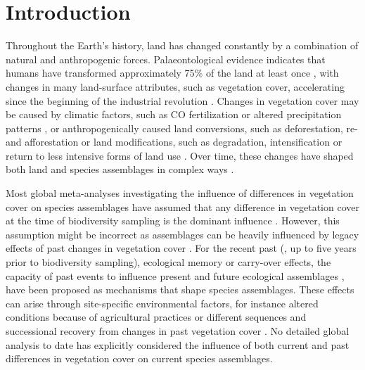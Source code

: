 \section{Introduction}
Throughout the Earth's history, land has changed constantly by a combination of natural and anthropogenic forces. Palaeontological evidence indicates that humans have transformed approximately 75\% of the land at least once \citep{Ellis2010,Ellis2011}, with changes in many land-surface attributes, such as vegetation cover, accelerating since the beginning of the industrial revolution \citep{Lambin2006,Steffen2015}. Changes in vegetation cover may be caused by climatic factors, such as CO fertilization or altered precipitation patterns \citep{Zhu2016}, or anthropogenically caused land conversions, such as deforestation, re- and afforestation \citep{Dupont2003,Hansen2013,Muller2014} or land modifications, such as degradation, intensification \citep{Gibbs2015,Rufin2015} or return to less intensive forms of land use \citep{Zomer2016}. Over time, these changes have shaped both land and species assemblages in complex ways \citep{Foster2003,Watson2014,Perring2015}.

Most global meta-analyses investigating the influence of differences in vegetation cover on species assemblages have assumed that any difference in vegetation cover at the time of biodiversity sampling is the dominant influence
\citep{Stein2014, Newbold2014b, Newbold2015, Alroy2017}. However, this assumption might be incorrect as assemblages can be heavily influenced by legacy effects of past changes in vegetation cover \citep{Foster2003, Watson2014, Ogle2015, Perring2015}. For the recent past (\eg, up to five years prior to biodiversity sampling), ecological memory or carry-over effects, \ie the capacity of past events to influence present and future ecological assemblages \citep{Harrison2011, OConnor2014, Ogle2015}, have been proposed as mechanisms that shape species assemblages. These effects can arise through site-specific environmental factors, for instance altered conditions because of agricultural practices \citep{Perring2015,Perring2018} or different sequences and successional recovery from changes in past vegetation cover \citep{Johnson2008,Walker2010,Watson2014}. No detailed global analysis to date has explicitly considered the influence of both current and past differences in vegetation cover on current species assemblages.

